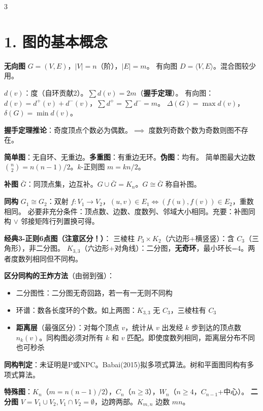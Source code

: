 \documentclass[10pt,a4paper,landscape]{ctexart}
\begin{document}
\setlength{\columnsep}{0.3cm}
\setlength{\columnseprule}{0.3pt}

\begin{multicols}{3}
\fontsize{10}{11}\selectfont

\section*{1. 图的基本概念}

\textbf{无向图} $G=(V,E)$，$|V|=n$（阶），$|E|=m$。
有向图 $D=\langle V,E\rangle$。混合图较少用。

$d(v)$：度（自环贡献2）。$\sum d(v)=2m$（\textbf{握手定理}）。
有向图：$d(v)=d^+(v)+d^-(v)$，$\sum d^+=\sum d^-=m$。
$\Delta(G)=\max d(v)$，$\delta(G)=\min d(v)$。

\textbf{握手定理推论}：奇度顶点个数必为偶数。$\implies$ 度数列奇数个数为奇数则图不存在。

\textbf{简单图}：无自环、无重边。\textbf{多重图}：有重边无环。\textbf{伪图}：均有。
简单图最大边数 $\binom{n}{2}=n(n-1)/2$。$k$-正则图 $m=kn/2$。

\textbf{补图} $\bar{G}$：同顶点集，边互补。$G\cup\bar{G}=K_n$。$G\cong\bar{G}$ 称自补图。

\textbf{同构} $G_1\cong G_2$：双射 $f:V_1\to V_2$，$(u,v)\in E_1\iff(f(u),f(v))\in E_2$，重数相同。
必要非充分条件：顶点数、边数、度数列、邻域大小相同。充要：补图同构 $\lor$ 邻接矩阵行列置换可得。

\textbf{经典3-正则6点图（注意区分！）}：
三棱柱 $P_3\times K_2$（六边形+横竖竖）：含 $C_3$（三角形），非二分图。
$K_{3,3}$（六边形+对角线）：二分图，\textbf{无奇环}，最小环长=4。两者度数列相同但不同构。

\textbf{区分同构的王炸方法}（由弱到强）：
\begin{itemize}
\item 二分图性：二分图无奇回路，若一有一无则不同构
\item 环谱：数各长度环的个数。如上两图：$K_{3,3}$ 无 $C_3$，三棱柱有 $C_3$
\item \textbf{距离层}（最强区分）：对每个顶点 $v$，统计从 $v$ 出发经 $k$ 步到达的顶点数 $n_k(v)$。同构图必须对所有 $k$ 和 $v$ 匹配。即使度数列相同，距离层分布不同也可秒杀
\end{itemize}

\textbf{同构判定}：未证明是P或NPC。Babai(2015)拟多项式算法。树和平面图同构有多项式算法。

\textbf{特殊图}：$K_n$（$m=n(n-1)/2$），$C_n$（$n\geq 3$），$W_n$（$n\geq 4$，$C_{n-1}$+中心）。
\textbf{二分图} $V=V_1\cup V_2,V_1\cap V_2=\emptyset$，边跨两部。$K_{m,n}$ 边数 $mn$。


\end{multicols}
\end{document}
